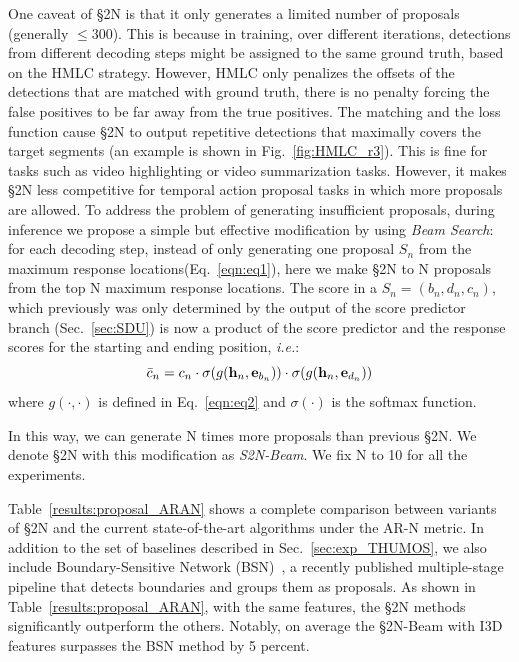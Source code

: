 \documentclass[10pt,journal,compsoc]{IEEEtran}
\begin{document}
One caveat of \S2N is that it only generates a limited number of proposals (generally $\leq 300$). This is because in training, over different iterations, detections from different decoding steps might be assigned to the same ground truth, based on the HMLC strategy. However, HMLC only penalizes the offsets of the detections that are matched with ground truth, there is no penalty forcing the false positives to be far away from the true positives. The matching and the loss function cause \S2N to output repetitive detections that maximally covers the target segments (an example is shown in Fig.~\ref{fig:HMLC_r3}).  This is fine for tasks such as video highlighting or video summarization tasks. However, it makes \S2N less competitive for temporal action proposal tasks in which more proposals are allowed. 
To address the problem of generating insufficient proposals, during inference we propose a simple but effective modification by using \emph{Beam Search}: for each decoding step, instead of only generating one proposal $S_n$ from the maximum response locations(Eq.~\ref{eqn:eq1}), here we make \S2N to N proposals from the top N maximum response locations. The score in a $S_n = (b_n, d_n, c_n)$, which previously was only determined by the output of the score predictor branch (Sec.~\ref{sec:SDU}) is now a product of the score predictor and the response scores for the starting and ending position, \emph{i.e.}:
\begin{equation}
    \Bar{c}_n = c_n \cdot \sigma (g ({\bf h}_n, {\bf e}_{b_n})) \cdot \sigma(g({\bf h}_n, {\bf e}_{d_n}))
\end{equation}
where $g(\cdot, \cdot)$ is defined in Eq.~\ref{eqn:eq2} and $\sigma(\cdot)$ is the softmax function.

In this way, we can generate N times more proposals than previous \S2N. We denote \S2N with this modification as \emph{S2N-Beam}. We fix N to 10 for all the experiments.


Table~\ref{results:proposal_ARAN} shows a complete comparison between variants of \S2N and the current state-of-the-art algorithms under the AR-N metric. In addition to the set of baselines described in Sec.~\ref{sec:exp_THUMOS}, we also include Boundary-Sensitive Network (BSN)~\cite{lin2018BSN}, a recently published multiple-stage pipeline that detects boundaries and groups them as proposals. As shown in Table~\ref{results:proposal_ARAN}, with the same features, the \S2N methods significantly outperform the others. Notably, on average the \S2N-Beam with I3D features surpasses the BSN method by 5 percent.
\end{document}
